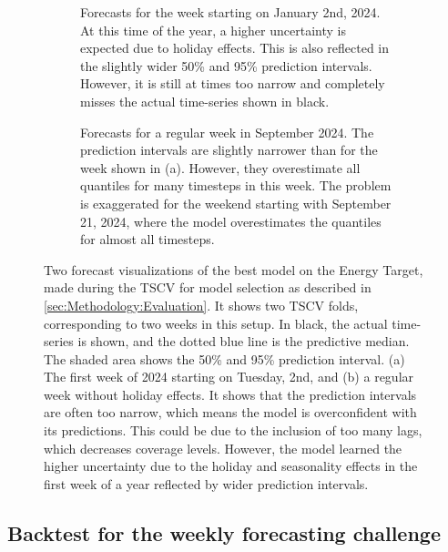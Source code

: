 \begin{figure}[htbp]
    \centering
    \begin{subfigure}[b]{0.95\textwidth}
        \centering
        
        \caption{Forecasts for the week starting on January 2nd, 2024. At this time of the year, a higher uncertainty is expected due to holiday effects. This is also reflected in the slightly wider 50\% and 95\% prediction intervals. However, it is still at times too narrow and completely misses the actual time-series shown in black.}
        \label{fig:forecast-plot-1}
    \end{subfigure}
    \begin{subfigure}[b]{0.95\textwidth}
        \centering
        
        \caption{Forecasts for a regular week in September 2024. The prediction intervals are slightly narrower than for the week shown in (a). However, they overestimate all quantiles for many timesteps in this week. The problem is exaggerated for the weekend starting with September 21, 2024, where the model overestimates the quantiles for almost all timesteps.}
        \label{fig:forecast-plot-2}
    \end{subfigure}
    \caption{Two forecast visualizations of the best model on the Energy Target, made during the TSCV for model selection as described in \cref{sec:Methodology:Evaluation}. It shows two TSCV folds, corresponding to two weeks in this setup. In black, the actual time-series is shown, and the dotted blue line is the predictive median. The shaded area shows the 50\% and 95\% prediction interval. (a) The first week of 2024 starting on Tuesday, 2nd, and (b) a regular week without holiday effects. It shows that the prediction intervals are often too narrow, which means the model is overconfident with its predictions. This could be due to the inclusion of too many lags, which decreases coverage levels. However, the model learned the higher uncertainty due to the holiday and seasonality effects in the first week of a year reflected by wider prediction intervals.}
    \label{fig:Forecast-visualization}
\end{figure}


\subsection{Backtest for the weekly forecasting challenge}
\label{sec:Results:Backtest}
